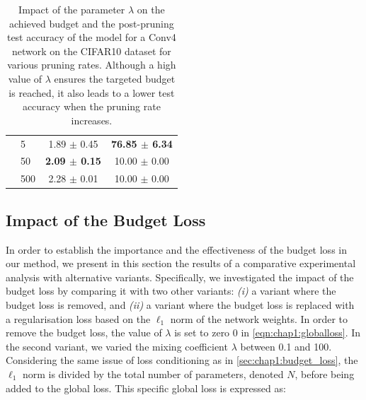 \begin{table}[tbp]
\begin{center}
\begin{tabular}{llcc}
                                 & 5                                          & 1.89 $\pm$ 0.45               & \textbf{76.85 $\pm$ 6.34} \\
                                 & 50                                         & \textbf{2.09 $\pm$ 0.15}      & 10.00 $\pm$ 0.00          \\
                                 & 500                                        & 2.28 $\pm$ 0.01               & 10.00 $\pm$ 0.00          \\
      \bottomrule
    \end{tabular}
  \end{center}
  \caption{
    Impact of the parameter $\lambda$ on the achieved budget and the post-pruning test accuracy of the model for a Conv4 network on the CIFAR10 dataset
    for various pruning rates. Although a high value of $\lambda$ ensures
    the targeted budget is reached, it also leads to a lower test accuracy when
    the pruning rate increases.}
  \label{tab:chap1:lambda_impact}
\end{table}



\subsection{Impact of the Budget Loss}
\label{sec:chap1:impact_of_budget_loss}


In order to establish the importance and the effectiveness of the budget loss in our
method, we present in this section the results of a comparative experimental
analysis with alternative variants.  Specifically, we investigated the impact of
the budget loss by comparing it with two other variants: \emph{(i)} a variant
where the budget loss is removed, and \emph{(ii)} a variant where the budget
loss is replaced with a regularisation loss based on the $\ell_1$ norm of the
network weights. In order to remove the budget loss, the value of $\lambda$ is set to
zero 0 in \cref{eqn:chap1:globalloss}. In the second variant, we varied the
mixing coefficient $\lambda$ between 0.1 and 100. Considering the same issue of
loss conditioning as in \cref{sec:chap1:budget_loss}, the $\ell_1$ norm is divided
by the total number of parameters, denoted $N$, before being added to the global loss. This
specific global loss is expressed as:

